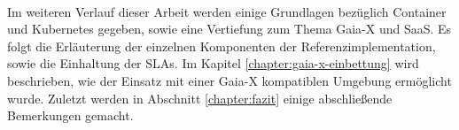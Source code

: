 \paragraph{}
Im weiteren Verlauf dieser Arbeit werden einige Grundlagen bezüglich Container und Kubernetes gegeben,
sowie eine Vertiefung zum Thema Gaia-X und \acf{SaaS}.
Es folgt die Erläuterung der einzelnen Komponenten der Referenzimplementation, sowie die Einhaltung der \acp{SLA}.
Im Kapitel \ref{chapter:gaia-x-einbettung} wird beschrieben, wie der Einsatz mit einer Gaia-X kompatiblen Umgebung ermöglicht wurde.
Zuletzt werden in Abschnitt \ref{chapter:fazit} einige abschließende Bemerkungen gemacht.